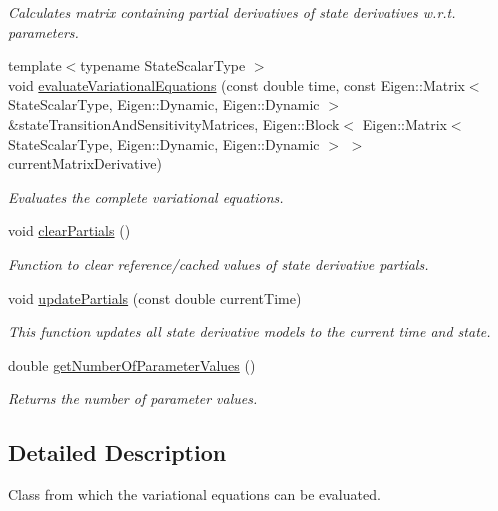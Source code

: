 \begin{DoxyCompactItemize}
\begin{DoxyCompactList}\small\item\em Calculates matrix containing partial derivatives of state derivatives w.\+r.\+t. parameters. \end{DoxyCompactList}\item 
{\footnotesize template$<$typename State\+Scalar\+Type $>$ }\\void \hyperlink{classtudat_1_1propagators_1_1VariationalEquations_ae9c3c5031af179bd999b41c06615e62a}{evaluate\+Variational\+Equations} (const double time, const Eigen\+::\+Matrix$<$ State\+Scalar\+Type, Eigen\+::\+Dynamic, Eigen\+::\+Dynamic $>$ \&state\+Transition\+And\+Sensitivity\+Matrices, Eigen\+::\+Block$<$ Eigen\+::\+Matrix$<$ State\+Scalar\+Type, Eigen\+::\+Dynamic, Eigen\+::\+Dynamic $>$ $>$ current\+Matrix\+Derivative)
\begin{DoxyCompactList}\small\item\em Evaluates the complete variational equations. \end{DoxyCompactList}\item 
void \hyperlink{classtudat_1_1propagators_1_1VariationalEquations_a1b07b80017664dc56701fe89b77d9fd6}{clear\+Partials} ()
\begin{DoxyCompactList}\small\item\em Function to clear reference/cached values of state derivative partials. \end{DoxyCompactList}\item 
void \hyperlink{classtudat_1_1propagators_1_1VariationalEquations_a0f8bf723ec6f863c6f8379d05d34a4f3}{update\+Partials} (const double current\+Time)
\begin{DoxyCompactList}\small\item\em This function updates all state derivative models to the current time and state. \end{DoxyCompactList}\item 
double \hyperlink{classtudat_1_1propagators_1_1VariationalEquations_a04796ab4c2dd1c1d24f09d39204b0a0d}{get\+Number\+Of\+Parameter\+Values} ()
\begin{DoxyCompactList}\small\item\em Returns the number of parameter values. \end{DoxyCompactList}\end{DoxyCompactItemize}


\subsection{Detailed Description}
Class from which the variational equations can be evaluated. 

